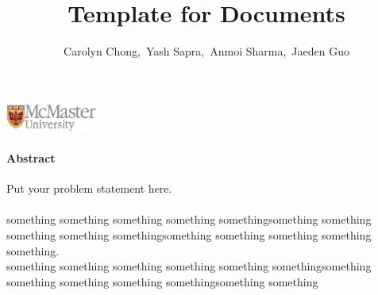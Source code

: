 \documentclass[12,titlepic]{article}
\begin{document}
	
	\begin{titlepage}
	
		\title{\vspace{3.5cm}Template for Documents\vspace{9cm} } 
		
		\author{Carolyn Chong,\ Yash Sapra,\ Anmoi Sharma,\ Jaeden Guo}
		
		\maketitle
		\centering\includegraphics[width=3cm]{mcmaster}
		\thispagestyle{headings}
		
		
		
	\end{titlepage}


\paragraph*{Abstract} %
Put your problem statement here.\\ \\
\indent something something something something somethingsomething something something something somethingsomething something something something something.\\ 
\indent something something something something something somethingsomething something something something somethingsomething something
\end{document}
